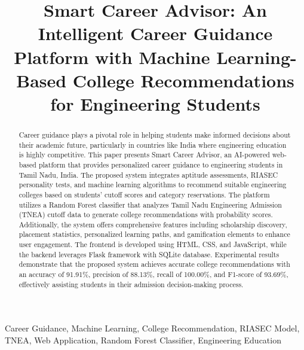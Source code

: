 \documentclass[journal]{IEEEtran}
\begin{document}
\title{Smart Career Advisor: An Intelligent Career Guidance Platform with Machine Learning-Based College Recommendations for Engineering Students}

\author{
}

\maketitle

\begin{abstract}
Career guidance plays a pivotal role in helping students make informed decisions about their academic future, particularly in countries like India where engineering education is highly competitive. This paper presents Smart Career Advisor, an AI-powered web-based platform that provides personalized career guidance to engineering students in Tamil Nadu, India. The proposed system integrates aptitude assessments, RIASEC personality tests, and machine learning algorithms to recommend suitable engineering colleges based on students' cutoff scores and category reservations. The platform utilizes a Random Forest classifier that analyzes Tamil Nadu Engineering Admission (TNEA) cutoff data to generate college recommendations with probability scores. Additionally, the system offers comprehensive features including scholarship discovery, placement statistics, personalized learning paths, and gamification elements to enhance user engagement. The frontend is developed using HTML, CSS, and JavaScript, while the backend leverages Flask framework with SQLite database. Experimental results demonstrate that the proposed system achieves accurate college recommendations with an accuracy of 91.91\%, precision of 88.13\%, recall of 100.00\%, and F1-score of 93.69\%, effectively assisting students in their admission decision-making process.
\end{abstract}

\begin{IEEEkeywords}
Career Guidance, Machine Learning, College Recommendation, RIASEC Model, TNEA, Web Application, Random Forest Classifier, Engineering Education
\end{IEEEkeywords}
\end{document}
